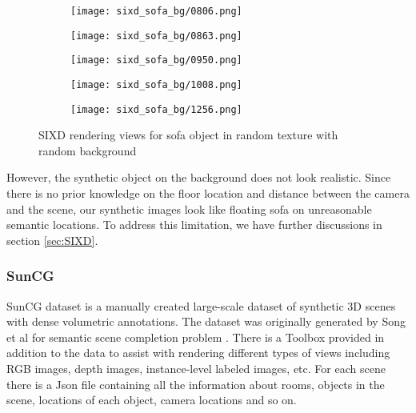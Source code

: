 \begin{figure}[h!]
\begin{subfigure}[b]{0.32\linewidth}
  \end{subfigure}
  \begin{subfigure}[b]{0.32\linewidth}
    \texttt{[image: sixd\_sofa\_bg/0806.png]}
  \end{subfigure}
  \begin{subfigure}[b]{0.32\linewidth}
    \texttt{[image: sixd\_sofa\_bg/0863.png]}
  \end{subfigure}
  \begin{subfigure}[b]{0.32\linewidth}
    \texttt{[image: sixd\_sofa\_bg/0950.png]}
  \end{subfigure}
  \begin{subfigure}[b]{0.32\linewidth}
    \texttt{[image: sixd\_sofa\_bg/1008.png]}
  \end{subfigure}
  \begin{subfigure}[b]{0.32\linewidth}
    \texttt{[image: sixd\_sofa\_bg/1256.png]}
  \end{subfigure}
  \caption{SIXD rendering views for sofa object in random texture with random background}
  \label{fig:sixd_sofa_bg}
\end{figure}

However, the synthetic object on the background does not look realistic. Since there is no prior knowledge on the floor location and distance between the camera and the scene, our synthetic images look like floating sofa on unreasonable semantic locations. To address this limitation, we have further discussions in section \ref{sec:SIXD}.

\subsubsection{SunCG}
SunCG dataset is a manually created large-scale dataset of synthetic 3D scenes with dense volumetric annotations. The dataset was originally generated by Song et al for semantic scene completion problem \cite{song2016ssc}. There is a Toolbox provided in addition to the data to assist with rendering different types of views including RGB images, depth images, instance-level labeled images, etc. For each scene there is a Json file containing all the information about rooms, objects in the scene, locations of each object, camera locations and so on. 

